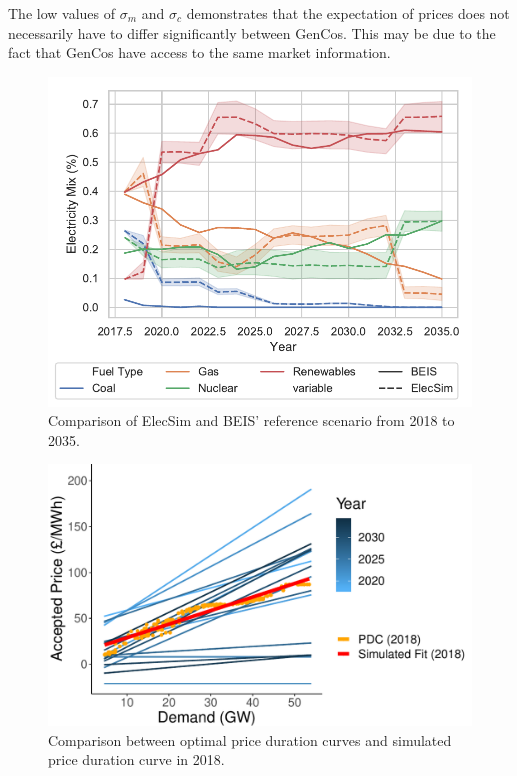 The low values of $\sigma_m$ and $\sigma_c$ demonstrates that the expectation of prices does not necessarily have to differ significantly between GenCos. This may be due to the fact that GenCos have access to the same market information.


\begin{figure}
	\centering
	\includegraphics[width=\textwidth]{Chapter4/figures/e-Energy-2020/results/scenario_analysis/best_forward_scenario_below_legend.pdf}
	\caption{Comparison of ElecSim and BEIS' reference scenario from 2018 to 2035.}
	\label{fig:forward_scenario_beis_elecsim}
\end{figure}



\begin{figure}
	\centering
	\includegraphics[width=\textwidth, height=0.6\textwidth, keepaspectratio]{Chapter4/figures/e-Energy-2020/results/scenario_analysis/optimal_pdc_prices.pdf}
	\caption{Comparison between optimal price duration curves and simulated price duration curve in 2018.}
	\label{fig:forward_scenario_best_pdcs}
\end{figure}



